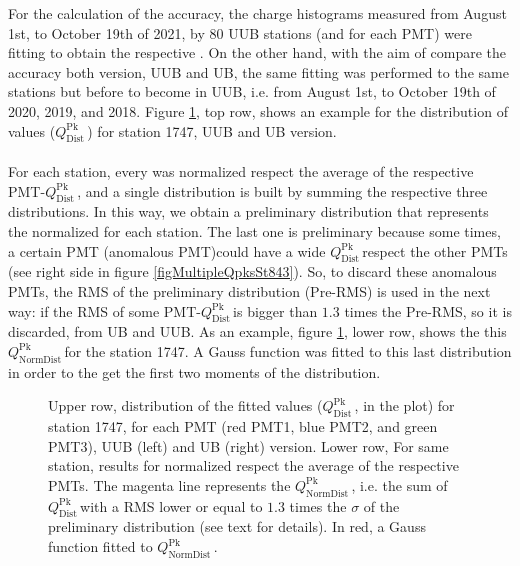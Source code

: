 \documentclass[twoside, final, 10pt]{articleMine}
\newcommand{\qpkDist}{$Q^\mathrm{Pk}_\mathrm{Dist}$\,}
\newcommand{\qpkNormDist}{$Q^\mathrm{Pk}_\mathrm{NormDist}$\,}
\begin{document}
For the calculation of the \qpkvem accuracy, the charge
histograms measured from August 1st, to October 19th of 2021, by
80 UUB stations (and for each PMT) were fitting to obtain the
respective \qpkvem. On the other hand, with the aim of compare
the accuracy both version, UUB and UB, the same fitting was
performed to the same stations but before to become in UUB, i.e.
from August 1st, to October 19th of 2020, 2019, and 2018. Figure
\ref{fig1747QpkValues}, top row, shows an example for the
distribution of \qpkvem values (\qpkDist) for station 1747, UUB
and UB version.\\\\For each station, every \qpkvem was normalized
respect the average of the respective PMT-\qpkDist, and a single
distribution is built by summing the respective three
distributions. In this way, we obtain a preliminary distribution
that represents the \qpkvem normalized for each station. The last
one is preliminary because some times, a certain PMT (anomalous
PMT)could have a wide \qpkDist respect the other PMTs (see right
side in figure \ref{figMultipleQpksSt843}). So, to discard these
anomalous PMTs, the RMS of the preliminary distribution (Pre-RMS)
is used in the next way: if the RMS of some PMT-\qpkDist is
bigger than $1.3$ times the Pre-RMS, so it is discarded, from UB
and UUB. As an example, figure \ref{fig1747QpkValues}, lower row,
shows the this \qpkNormDist for the station 1747. A Gauss
function was fitted to this last distribution in order to the get
the first two moments of the distribution.
\vspace{.5cm}

\begin{figure}[!t]
  \centering
  \caption{Upper row, distribution of the fitted \qpkvem values
  (\qpkDist, in the plot) for station 1747, for each PMT (red
  PMT1, blue PMT2, and green PMT3), UUB (left) and UB (right)
  version. Lower row, For same station, results for \qpkvem
  normalized respect the average of the respective PMTs. The
  magenta line represents the \qpkNormDist, i.e. the sum of
  \qpkDist with a RMS lower or equal to $1.3$ times the $\sigma$
  of the preliminary distribution (see text for details). In red,
  a Gauss function fitted to \qpkNormDist.}
  \label{fig1747QpkValues}
\end{figure}
\clearpage
\end{document}
